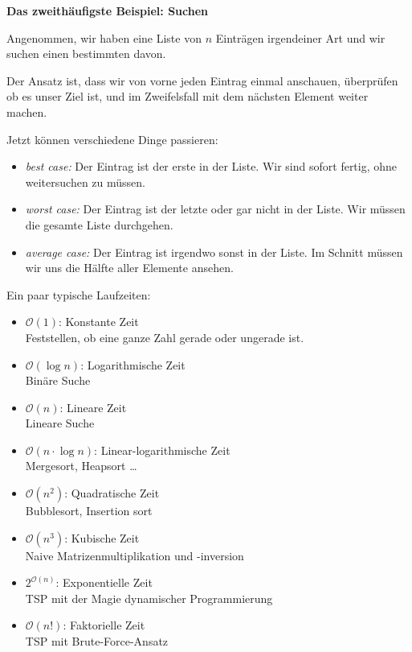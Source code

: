 \documentclass{beamer}
\begin{document}
\begin{frame}
\textbf{Das zweithäufigste Beispiel: Suchen}
\bigskip

Angenommen, wir haben eine Liste von $n$ Einträgen irgendeiner Art und wir suchen einen bestimmten davon.

Der Ansatz ist, dass wir von vorne jeden Eintrag einmal anschauen, überprüfen ob es unser Ziel ist, und im Zweifelsfall mit dem nächsten Element weiter machen.
\pause
\bigskip

Jetzt können verschiedene Dinge passieren:\pause

\begin{itemize}
\item \emph{best case:} Der Eintrag ist der erste in der Liste. Wir sind sofort fertig, ohne weitersuchen zu müssen.\pause
\item \emph{worst case:} Der Eintrag ist der letzte oder gar nicht in der Liste. Wir müssen die gesamte Liste durchgehen.\pause
\item \emph{average case:} Der Eintrag ist irgendwo sonst in der Liste. Im Schnitt müssen wir uns die Hälfte aller Elemente ansehen.
\end{itemize}

\end{frame}



\begin{frame}
Ein paar typische Laufzeiten:

\begin{itemize}
\item $\mathcal{O}(1)$: Konstante Zeit\\
Feststellen, ob eine ganze Zahl gerade oder ungerade ist.\pause
\item $\mathcal{O}(\log{}n)$: Logarithmische Zeit\\
Binäre Suche\pause
\item $\mathcal{O}(n)$: Lineare Zeit\\
Lineare Suche\pause
\item $\mathcal{O}(n \cdot \log{} n)$: Linear-logarithmische Zeit\\
Mergesort, Heapsort \dots
\item $\mathcal{O}(n^2)$: Quadratische Zeit\\
Bubblesort, Insertion sort\pause
\item $\mathcal{O}(n^3)$: Kubische Zeit\\
Naive Matrizenmultiplikation und -inversion\pause
\item $2^{\mathcal{O}(n)}$: Exponentielle Zeit\\
TSP mit der Magie dynamischer Programmierung\pause
\item $\mathcal{O}(n!)$: Faktorielle Zeit\\
TSP mit Brute-Force-Ansatz
\end{itemize}
\end{frame}
\end{document}
